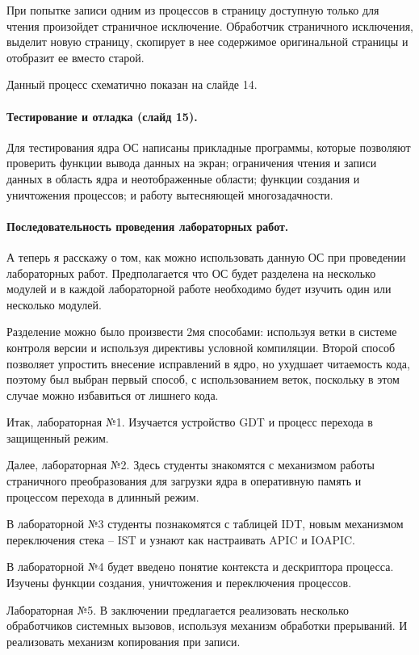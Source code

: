 \documentclass[12pt]{article}
\begin{document}
При попытке записи одним из процессов в страницу доступную только для чтения произойдет страничное исключение.
Обработчик страничного исключения, выделит новую страницу, скопирует в нее содержимое оригинальной страницы
и отобразит ее вместо старой.

Данный процесс схематично показан на слайде 14.


\paragraph{Тестирование и отладка (слайд 15).}
Для тестирования ядра ОС написаны прикладные программы, которые позволяют проверить функции вывода данных на экран;
ограничения чтения и записи данных в область ядра и неотображенные области; функции создания и уничтожения процессов;
и работу вытесняющей многозадачности.


\paragraph{Последовательность проведения лабораторных работ.}
А теперь я расскажу о том, как можно использовать данную ОС при проведении лабораторных работ.
Предполагается что ОС будет разделена на несколько модулей и в каждой лабораторной работе необходимо
будет изучить один или несколько модулей.

Разделение можно было произвести 2мя способами: используя ветки в системе контроля версии и используя
директивы условной компиляции. Второй способ позволяет упростить внесение исправлений в ядро, но
ухудшает читаемость кода, поэтому был выбран первый способ, с использованием веток, поскольку в этом
случае можно избавиться от лишнего кода.

Итак, лабораторная №1. Изучается устройство GDT и процесс перехода в защищенный режим.

Далее, лабораторная №2. Здесь студенты знакомятся с механизмом работы страничного преобразования для загрузки
ядра в оперативную память и процессом перехода в длинный режим.

В лабораторной №3 студенты познакомятся с таблицей IDT, новым механизмом переключения стека -- IST
и узнают как настраивать APIC и IOAPIC.

В лабораторной №4 будет введено понятие контекста и дескриптора процесса. Изучены функции создания,
уничтожения и переключения процессов.

Лабораторная №5. В заключении предлагается реализовать несколько обработчиков системных вызовов,
используя механизм обработки прерываний. И реализовать механизм копирования при записи.
\end{document}

